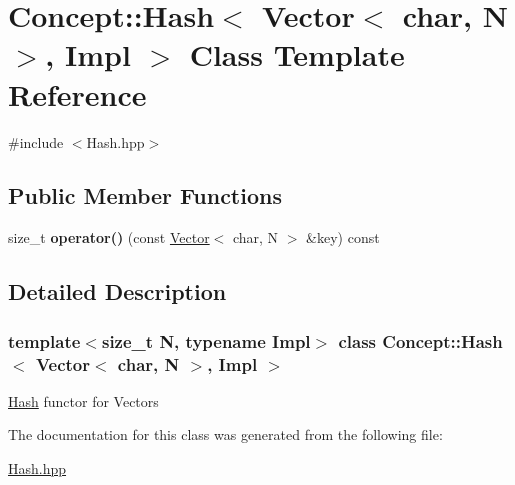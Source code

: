 \hypertarget{class_concept_1_1_hash_3_01_vector_3_01char_00_01_n_01_4_00_01_impl_01_4}{}\section{Concept\+::Hash$<$ Vector$<$ char, N $>$, Impl $>$ Class Template Reference}
\label{class_concept_1_1_hash_3_01_vector_3_01char_00_01_n_01_4_00_01_impl_01_4}


{\ttfamily \#include $<$Hash.\+hpp$>$}

\subsection*{Public Member Functions}
\begin{DoxyCompactItemize}
\item 
\mbox{\label{class_concept_1_1_hash_3_01_vector_3_01char_00_01_n_01_4_00_01_impl_01_4_a3d24c4f8b2ce2ff3656726ccbd735461}} 
size\+\_\+t {\bfseries operator()} (const \mbox{\hyperlink{class_concept_1_1_vector}{Vector}}$<$ char, N $>$ \&key) const
\end{DoxyCompactItemize}


\subsection{Detailed Description}
\subsubsection*{template$<$size\+\_\+t N, typename Impl$>$\newline
class Concept\+::\+Hash$<$ Vector$<$ char, N $>$, Impl $>$}

\mbox{\hyperlink{class_concept_1_1_hash}{Hash}} functor for Vectors 

The documentation for this class was generated from the following file\+:\begin{DoxyCompactItemize}
\item 
\mbox{\hyperlink{_hash_8hpp}{Hash.\+hpp}}\end{DoxyCompactItemize}
